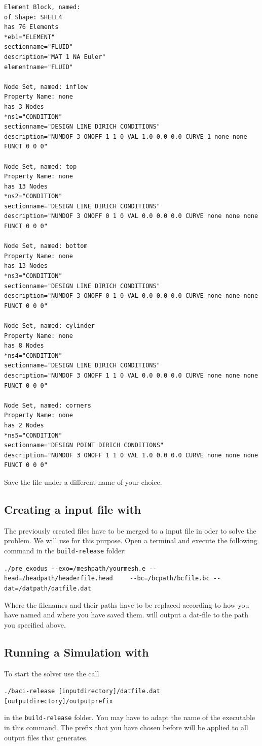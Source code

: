  \begin{small} \begin{verbatim}
Element Block, named: 
of Shape: SHELL4
has 76 Elements
*eb1="ELEMENT"
sectionname="FLUID"
description="MAT 1 NA Euler"
elementname="FLUID"

Node Set, named: inflow
Property Name: none
has 3 Nodes
*ns1="CONDITION"
sectionname="DESIGN LINE DIRICH CONDITIONS"
description="NUMDOF 3 ONOFF 1 1 0 VAL 1.0 0.0 0.0 CURVE 1 none none FUNCT 0 0 0"

Node Set, named: top
Property Name: none
has 13 Nodes
*ns2="CONDITION"
sectionname="DESIGN LINE DIRICH CONDITIONS"
description="NUMDOF 3 ONOFF 0 1 0 VAL 0.0 0.0 0.0 CURVE none none none FUNCT 0 0 0"

Node Set, named: bottom
Property Name: none
has 13 Nodes
*ns3="CONDITION"
sectionname="DESIGN LINE DIRICH CONDITIONS"
description="NUMDOF 3 ONOFF 0 1 0 VAL 0.0 0.0 0.0 CURVE none none none FUNCT 0 0 0"

Node Set, named: cylinder
Property Name: none
has 8 Nodes
*ns4="CONDITION"
sectionname="DESIGN LINE DIRICH CONDITIONS"
description="NUMDOF 3 ONOFF 1 1 0 VAL 0.0 0.0 0.0 CURVE none none none FUNCT 0 0 0"

Node Set, named: corners
Property Name: none
has 2 Nodes
*ns5="CONDITION"
sectionname="DESIGN POINT DIRICH CONDITIONS"
description="NUMDOF 3 ONOFF 1 1 0 VAL 1.0 0.0 0.0 CURVE none none none FUNCT 0 0 0"
 \end{verbatim} \end{small}
Save the file under a different name of your choice.

\subsection{Creating a \baci{} input file with \prexo}
The previously created files have to be merged to a \baci{} input file in oder
to solve the problem. We will use \prexo for this purpose. Open a terminal
and execute the following command in the \texttt{build-release} folder:
\begin{center}
  \verb|./pre_exodus --exo=/meshpath/yourmesh.e --head=/headpath/headerfile.head|
  \verb|	--bc=/bcpath/bcfile.bc --dat=/datpath/datfile.dat|
\end{center}
Where the filenames and their paths have to be replaced according to how you have named and where you have saved them.
\prexo will output a dat-file to the path you specified above.


\subsection{Running a Simulation with \baci{}}
\label{tut_fluid_preexo:baci}
To start the solver use the call
\begin{center}
	\verb|./baci-release [inputdirectory]/datfile.dat [outputdirectory]/outputprefix|
\end{center}
in the \texttt{build-release} folder. You may have to adapt the name of the executable
in this command. The prefix that you have chosen before will
be applied to all output files that \baci{} generates.


